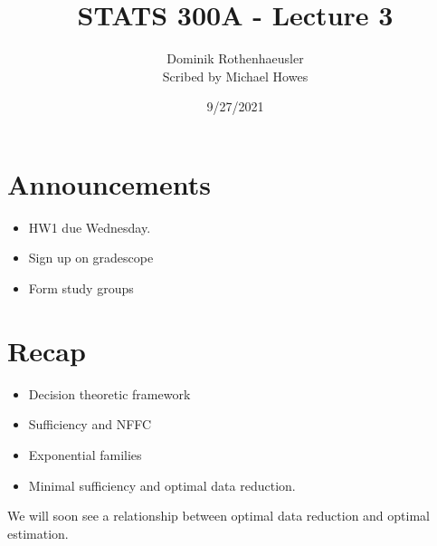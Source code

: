 




\title{STATS 300A - Lecture 3}
\author{Dominik Rothenhaeusler\\
Scribed by Michael Howes}
\date{9/27/2021}

\pagestyle{fancy}
\fancyhf{}


\maketitle
\tableofcontents
\section{Announcements}
\begin{itemize}
    \item HW1 due Wednesday.
    \item Sign up on gradescope
    \item Form study groups
\end{itemize}
\section{Recap}
\begin{itemize}
    \item Decision theoretic framework
    \item Sufficiency and NFFC
    \item Exponential families
    \item Minimal sufficiency and optimal data reduction.
\end{itemize}
We will soon see a relationship between optimal data reduction and optimal estimation.

